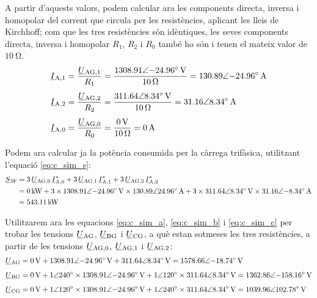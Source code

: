 \begin{exemple}
    A partir d'aquests valors, podem calcular ara les components
    directa, inversa i homopolar del corrent que circula per les
    resistències, aplicant les lleis de Kirchhoff; com que les tres resistències són idèntiques, les seves  components    directa, inversa i homopolar $R_1$,  $R_2$ i $R_0$ també ho són i tenen el mateix valor de $\qty{10}{\ohm}$.
    \begin{align*}
    \cmplx{I}\ped{A,1} &=
    \frac{\cmplx{U}\ped{AG,1}}{R_1} =
    \frac{\complexqty{1308,91:-24,96}{V}}{\qty{10}{\ohm}} =
    \complexqty{130,89:-24,96}{A} \\[1ex]
    \cmplx{I}\ped{A,2} &=
    \frac{\cmplx{U}\ped{AG,2}}{R_2} =
    \frac{\complexqty{311,64:8,34}{V}}{\qty{10}{\ohm}} =
    \complexqty{31,16:8,34}{A} \\[1ex]
    \cmplx{I}\ped{A,0} &=
    \frac{\cmplx{U}\ped{AG,0}}{R_0} =
    \frac{\qty{0}{V}}{\qty{10}{\ohm}} =
    \qty{0}{A}
    \end{align*}

    Podem ara  calcular ja  la potència consumida per la càrrega
    trifàsica, utilitzant l'equació \eqref{eq:c_sim_s}:
    \[
    \begin{split}
    \cmplx{S}\ped{3F} &=  3\,
    \cmplx{U}\ped{AG,0}\,  \cmplx{I}\ped{A,0}^* +
    3\, \cmplx{U}\ped{AG,1}\,
    \cmplx{I}\ped{A,1}^* + 3\, \cmplx{U}\ped{AG,2}\,
    \cmplx{I}\ped{A,2}^*   \\
    &= \qty{0}{kW} + 3 \times \complexqty{1308,91:-24,96}{V} \times
    \complexqty{130,89:24,96}{A} + 3 \times
    \complexqty{311,64:8,34}{V} \times \complexqty{31,16:-8,34}{A}  \\
    &= \qty{543,11}{kW}
    \end{split}
    \]

    Utilitzarem ara les equacions \eqref{eq:c_sim_a},
    \eqref{eq:c_sim_b} i \eqref{eq:c_sim_c} per trobar les tensions $\cmplx{U}\ped{AG}$, $\cmplx{U}\ped{BG}$ i $\cmplx{U}\ped{CG}$, a què
    estan sotmeses les tres resistències, a partir de les  tensions $\cmplx{U}\ped{AG,0}$, $\cmplx{U}\ped{AG,1}$ i $\cmplx{U}\ped{AG,2}$:
    \begin{align*}
        \cmplx{U}\ped{AG} &= \qty{0}{V} + \complexqty{1308,91:-24,96}{V} +
        \complexqty{311,64:8,34}{V}  =
        \complexqty{1578,66:-18,74}{V} \\[1ex]
        \cmplx{U}\ped{BG} &= \qty{0}{V} + \complexnum{1:240} \times
        \complexqty{1308,91:-24,96}{V} +
        \complexnum{1:120} \times
        \complexqty{311,64:8,34}{V}  =
        \complexqty{1362,86:-158,16}{V}    \\[1ex]
        \cmplx{U}\ped{CG} &= \qty{0}{V} + \complexnum{1:120} \times
        \complexqty{1308,91:-24,96}{V} +
        \complexnum{1:240} \times \complexqty{311,64:8,34}{V}  =
        \complexqty{1039,96:102,78}{V}
    \end{align*}


\end{exemple}
